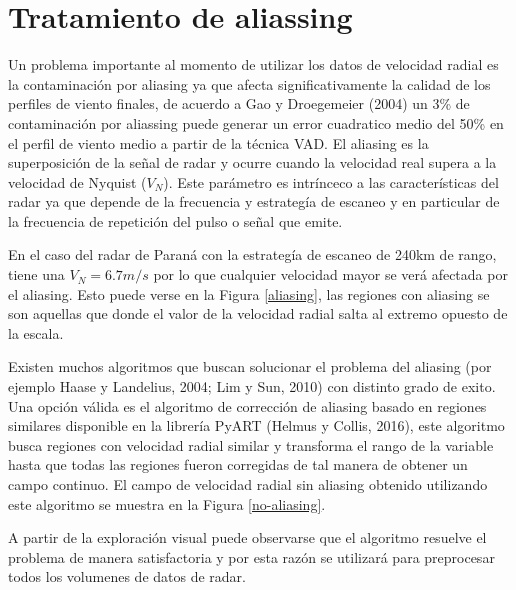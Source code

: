 \documentclass[12pt,spanish,oneside]{book}
\begin{document}
\section{Tratamiento de aliassing}\label{tratamiento-de-aliassing}

Un problema importante al momento de utilizar los datos de velocidad
radial es la contaminación por aliasing ya que afecta significativamente
la calidad de los perfiles de viento finales, de acuerdo a Gao y
Droegemeier (2004) un 3\% de contaminación por aliassing puede generar
un error cuadratico medio del 50\% en el perfil de viento medio a partir
de la técnica VAD. El aliasing es la superposición de la señal de radar
y ocurre cuando la velocidad real supera a la velocidad de Nyquist
(\(V_N\)). Este parámetro es intrínceco a las características del radar
ya que depende de la frecuencia y estrategía de escaneo y en particular
de la frecuencia de repetición del pulso o señal que emite.

En el caso del radar de Paraná con la estrategía de escaneo de 240km de
rango, tiene una \(V_N = 6.7 m/s\) por lo que cualquier velocidad mayor
se verá afectada por el aliasing. Esto puede verse en la Figura
\ref{aliasing}, las regiones con aliasing se son aquellas que donde el
valor de la velocidad radial salta al extremo opuesto de la escala.

Existen muchos algoritmos que buscan solucionar el problema del aliasing
(por ejemplo Haase y Landelius, 2004; Lim y Sun, 2010) con distinto
grado de exito. Una opción válida es el algoritmo de corrección de
aliasing basado en regiones similares disponible en la librería PyART
(Helmus y Collis, 2016), este algoritmo busca regiones con velocidad
radial similar y transforma el rango de la variable hasta que todas las
regiones fueron corregidas de tal manera de obtener un campo continuo.
El campo de velocidad radial sin aliasing obtenido utilizando este
algoritmo se muestra en la Figura \ref{no-aliasing}.

A partir de la exploración visual puede observarse que el algoritmo
resuelve el problema de manera satisfactoria y por esta razón se
utilizará para preprocesar todos los volumenes de datos de radar.
\end{document}
